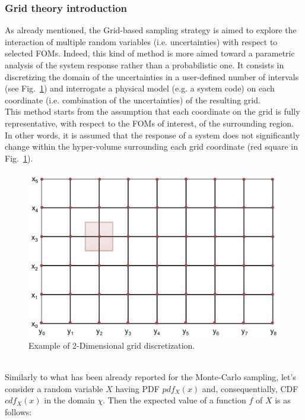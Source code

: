 \subsubsection{Grid theory introduction}
\label{subsub:Gridtheory}
As already mentioned, the Grid-based sampling strategy is aimed to explore the interaction of multiple random 
variables (i.e. uncertainties) with respect to selected FOMs. Indeed, this kind of method is more aimed toward a 
parametric analysis of the system response rather than a probabilistic one. It consists in discretizing the
domain of the uncertainties in a user-defined number of intervals (see Fig.~\ref{fig:GridDiscretization}) and 
interrogate a physical model (e.g. a system code) on each coordinate (i.e. combination of the uncertainties) of the resulting grid.
\\ This method starts from the assumption that each coordinate on the grid is fully representative, with respect to the FOMs of interest, of the surrounding region. In other words, it is assumed that the response of a system does not significantly change within the hyper-volume surrounding each grid coordinate (red square in Fig.~\ref{fig:GridDiscretization}).
 \begin{figure}[h!]
  \centering
  \includegraphics[scale=0.7]{pics/GridDiscretization.png}
  \caption{Example of 2-Dimensional grid discretization. }
  \label{fig:GridDiscretization}
 \end{figure}
\\Similarly to what has been already reported for the Monte-Carlo sampling, let's consider a random variable $X$ having PDF $pdf_{X}(x)$ and, consequentially, CDF $cdf_{X}(x)$ in the domain $\chi$. Then the expected value of a function $f$ of $X$ is as follows:
